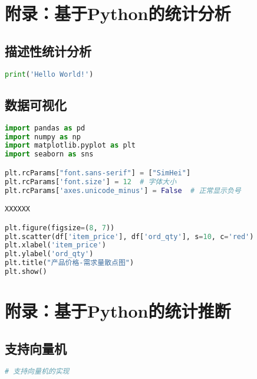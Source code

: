 
\appendix  %

\section{附录：基于Python的统计分析}

\subsection{描述性统计分析}


\begin{lstlisting}[language=Python]
print('Hello World!')
\end{lstlisting}



\subsection{数据可视化}


\begin{lstlisting}[language=Python]
import pandas as pd
import numpy as np
import matplotlib.pyplot as plt
import seaborn as sns

plt.rcParams["font.sans-serif"] = ["SimHei"]
plt.rcParams['font.size'] = 12  # 字体大小
plt.rcParams['axes.unicode_minus'] = False  # 正常显示负号

XXXXXX

plt.figure(figsize=(8, 7))
plt.scatter(df['item_price'], df['ord_qty'], s=10, c='red')
plt.xlabel('item_price')
plt.ylabel('ord_qty')
plt.title("产品价格-需求量散点图")
plt.show()
\end{lstlisting}


\section{附录：基于Python的统计推断}

\subsection{支持向量机}

\begin{lstlisting}[language=Python]
# 支持向量机的实现
\end{lstlisting}


